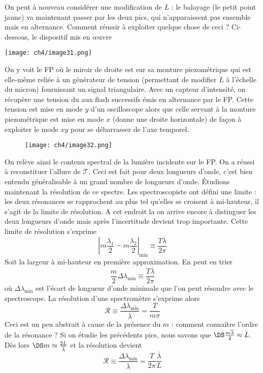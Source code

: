 On peut à nouveau considérer une modification de $L$ : le balayage (le petit point jaune) va maintenant 
passer par les deux pics, qui n'apparaissent pas ensemble mais en alternance. Comment réussir à exploiter 
quelque chose de ceci ? Ci-dessous, le dispositif mis en œuvre
\newpage
\begin{center}
	\texttt{[image: ch4/image31.png]}
\end{center}
On y voit le FP où le miroir de droite est sur sa monture piezométrique qui est elle-même reliée à 
un générateur de tension (permettant de modifier $L$ à l'échelle du micron) fournissant un signal 
triangulaire. Avec un capteur d'intensité, on récupère une tension du aux flash successifs émis en 
alternance par le FP. Cette tension est mise en mode $y$ d'un oscilloscope alors que celle servant 
à la monture piezométrique est mise en mode $x$ (donne une droite horizontale) de façon à exploiter 
le mode $xy$ pour se débarrasser de l'axe temporel.\\

	\begin{wrapfigure}[9]{r}{7.5cm}
	\vspace{-8mm}
	\texttt{[image: ch4/image32.png]}
	\end{wrapfigure}
On relève ainsi le contenu spectral de la lumière incidente sur le FP. On a réussi à reconstituer 
l'allure de $\mathcal{T}$. Ceci est fait pour deux longueurs d'onde, c'est bien entendu généralisable 
à un grand nombre de longueurs d'onde. Étudions maintenant la résolution de ce spectre. Les 
spectroscopiste ont défini une limite : les deux résonances se rapprochent au plus tel qu'elles se 
croisent à mi-hauteur, il s'agit de la limite de résolution. A cet endroit la on arrive encore à 
distinguer les deux longueurs d'onde mais après l'incertitude devient trop importante. Cette limite 
de résolution s'exprime
\begin{equation}
\left|m\dfrac{\lambda_1}{2}-m\dfrac{\lambda_2}{2}\right|_{\min} \equiv \dfrac{T\overline{\lambda}}{2\pi}
\end{equation}
Soit la largeur à mi-hauteur en première approximation. En peut en trier
\begin{equation}
\dfrac{m}{2}\Delta\lambda_{\min} \equiv\dfrac{T\overline{\lambda}}{2\pi}
\end{equation}
où $\Delta\lambda_{\min}$ est l'écart de longueur d'onde minimale que l'on peut résoudre avec le 
spectroscope. La résolution d'une spectromètre s'exprime alors
\begin{equation}
\mathcal{R} \equiv\dfrac{\Delta\lambda_{\min}}{\overline{\lambda}} = \dfrac{T}{m\pi}
\end{equation}
Ceci est un peu abstrait à cause de la présence du $m$ : comment connaître l'ordre de la résonance ? 
Si on étudie les précédents pics, nous savons que $\DS\frac{m\overline{\lambda}}{2}\approx L$. Dès 
lors $\DS m\approx \frac{2L}{\overline{\lambda}}$ et la résolution devient
\begin{equation}
\mathcal{R} \equiv\dfrac{\Delta\lambda_{\min}}{\overline{\lambda}} =\dfrac{T}{2\pi}\dfrac{\overline{\lambda}}{L}
\end{equation}\ \\

